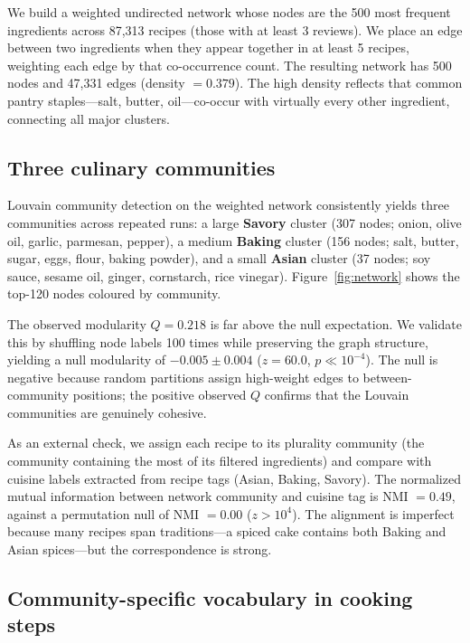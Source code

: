 \documentclass[9pt,twocolumn]{pnas-new}
\begin{document}
We build a weighted undirected network whose nodes are the 500 most frequent ingredients across 87,313 recipes (those with at least 3 reviews). We place an edge between two ingredients when they appear together in at least 5 recipes, weighting each edge by that co-occurrence count. The resulting network has 500 nodes and 47,331 edges (density $= 0.379$). The high density reflects that common pantry staples---salt, butter, oil---co-occur with virtually every other ingredient, connecting all major clusters.

\subsection*{Three culinary communities}

Louvain community detection \cite{blondel2008fast} on the weighted network consistently yields three communities across repeated runs: a large \textbf{Savory} cluster (307 nodes; onion, olive oil, garlic, parmesan, pepper), a medium \textbf{Baking} cluster (156 nodes; salt, butter, sugar, eggs, flour, baking powder), and a small \textbf{Asian} cluster (37 nodes; soy sauce, sesame oil, ginger, cornstarch, rice vinegar). Figure~\ref{fig:network} shows the top-120 nodes coloured by community.

The observed modularity $Q = 0.218$ is far above the null expectation. We validate this by shuffling node labels 100 times while preserving the graph structure, yielding a null modularity of $-0.005 \pm 0.004$ ($z = 60.0$, $p \ll 10^{-4}$). The null is negative because random partitions assign high-weight edges to between-community positions; the positive observed $Q$ confirms that the Louvain communities are genuinely cohesive.

As an external check, we assign each recipe to its plurality community (the community containing the most of its filtered ingredients) and compare with cuisine labels extracted from recipe tags (Asian, Baking, Savory). The normalized mutual information between network community and cuisine tag is NMI $= 0.49$, against a permutation null of NMI $= 0.00$ ($z > 10^4$). The alignment is imperfect because many recipes span traditions---a spiced cake contains both Baking and Asian spices---but the correspondence is strong.

\subsection*{Community-specific vocabulary in cooking steps}
\end{document}
